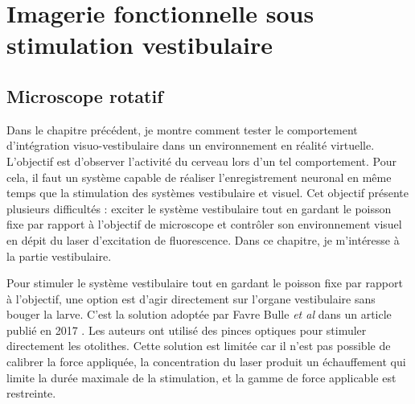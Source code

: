 \chapter{Imagerie fonctionnelle sous stimulation vestibulaire}\label{chapIII}





\section{Microscope rotatif}

Dans le chapitre précédent, je montre comment tester le comportement d'intégration visuo-vestibulaire dans un environnement en réalité virtuelle. L'objectif est d'observer l'activité du cerveau lors d'un tel comportement. Pour cela, il faut un système capable de réaliser l'enregistrement neuronal en même temps que la stimulation des systèmes vestibulaire et visuel. Cet objectif présente plusieurs difficultés : exciter le système vestibulaire tout en gardant le poisson fixe par rapport à l'objectif de microscope et contrôler son environnement visuel en dépit du laser d'excitation de fluorescence. Dans ce chapitre, je m'intéresse à la partie vestibulaire.

Pour stimuler le système vestibulaire tout en gardant le poisson fixe par rapport à l'objectif, une option est d'agir directement sur l'organe vestibulaire sans bouger la larve. C'est la solution adoptée par Favre Bulle \emph{et al} dans un article publié en 2017 \cite{favre-bulle_optical_2017}. Les auteurs ont utilisé des pinces optiques pour stimuler directement les otolithes. Cette solution est limitée car il n'est pas possible de calibrer la force appliquée, la concentration du laser produit un échauffement qui limite la durée maximale de la stimulation, et la gamme de force applicable est restreinte.

